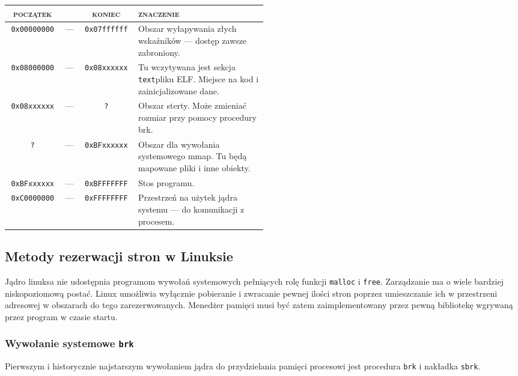 \documentclass[12pt,a4paper,titlepage,twoside]{mwart}
\begin{document}
\begin{center}
\begin{tabular}{|ccc|p{0.5\linewidth}|}
\hline
\textsc{początek} & & \textsc{koniec} & \textsc{znaczenie} \\
\hline
\hline
\texttt{0x00000000} & --- & \texttt{0x07ffffff} & Obszar wyłapywania złych wskaźników --- dostęp zawsze zabroniony.\\
\hline
\texttt{0x08000000} & --- & \texttt{0x08xxxxxx} & Tu wczytywana jest sekcja \texttt{text}\footnotemark pliku ELF. Miejsce na kod i zainicjalizowane dane.\\
\hline
\texttt{0x08xxxxxx} & --- & \texttt{?}          & Obszar sterty. Może zmieniać rozmiar przy pomocy procedury brk.\\
\hline
\texttt{?}          & --- & \texttt{0xBFxxxxxx} & Obszar dla wywołania systemowego mmap. Tu będą mapowane pliki i inne obiekty.\\
\hline
\texttt{0xBFxxxxxx} & --- & \texttt{0xBFFFFFFF} & Stos programu.\\
\hline
\texttt{0xC0000000} & --- & \texttt{0xFFFFFFFF} & Przestrzeń na użytek jądra systemu --- do komunikacji z procesem.\\
\hline
\end{tabular}
\end{center}

\subsection{Metody rezerwacji stron w Linuksie}

Jądro linuksa nie udostępnia programom wywołań systemowych pełniących rolę
funkcji \texttt{malloc} i \texttt{free}. Zarządzanie ma o wiele bardziej
niskopoziomową postać. Linux umożliwia wyłącznie pobieranie i zwracanie pewnej
ilości stron poprzez umieszczanie ich w przestrzeni adresowej w obszarach do
tego zarezerwowanych. Menedżer pamięci musi być zatem zaimplementowany przez
pewną bibliotekę wgrywaną przez program w czasie startu.

\subsubsection{Wywołanie systemowe \texttt{brk}}

Pierwszym i historycznie najstarszym wywołaniem jądra do przydzielania pamięci
procesowi jest procedura \texttt{brk} i nakładka \texttt{sbrk}.
\end{document}
